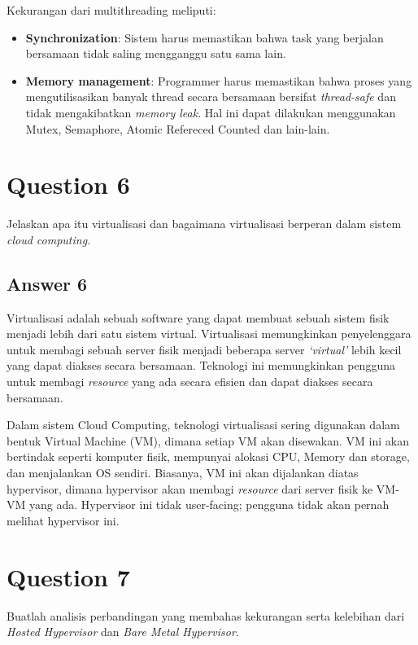 \documentclass[
	11pt, %
	indonesian
]{assignment}
\begin{document}
Kekurangan dari multithreading meliputi:
\begin{itemize}
	\item \textbf{Synchronization}: Sistem harus memastikan bahwa task yang berjalan bersamaan tidak saling mengganggu satu sama lain.
	\item \textbf{Memory management}: Programmer harus memastikan bahwa proses yang mengutilisasikan banyak thread secara bersamaan bersifat \textit{thread-safe} dan tidak mengakibatkan \textit{memory leak}. Hal ini dapat dilakukan menggunakan Mutex, Semaphore, Atomic Refereced Counted dan lain-lain.
\end{itemize}
\section*{Question 6}
\begin{problem}
Jelaskan apa itu virtualisasi dan bagaimana virtualisasi berperan dalam sistem \textit{cloud computing}.
\end{problem}

\subsection*{Answer 6}
Virtualisasi adalah sebuah software yang dapat membuat sebuah sistem fisik menjadi lebih dari satu sistem virtual. Virtualisasi memungkinkan penyelenggara untuk membagi sebuah server fisik menjadi beberapa server \textit{`virtual'} lebih kecil yang dapat diakses secara bersamaan. Teknologi ini memungkinkan pengguna untuk membagi \textit{resource} yang ada secara efisien dan dapat diakses secara bersamaan.

Dalam sistem Cloud Computing, teknologi virtualisasi sering digunakan dalam bentuk Virtual Machine (VM), dimana setiap VM akan disewakan. VM ini akan bertindak seperti komputer fisik, mempunyai alokasi CPU, Memory dan storage, dan menjalankan OS sendiri. Biasanya, VM ini akan dijalankan diatas hypervisor, dimana hypervisor akan membagi \textit{resource} dari server fisik ke VM-VM yang ada. Hypervisor ini tidak user-facing; pengguna tidak akan pernah melihat hypervisor ini.

\section*{Question 7}
\begin{problem}
Buatlah analisis perbandingan yang membahas kekurangan serta kelebihan dari \textit{Hosted Hypervisor} dan \textit{Bare Metal Hypervisor}.
\end{problem}
\end{document}
